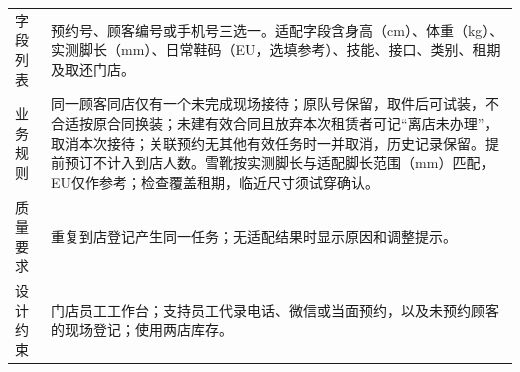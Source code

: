 \documentclass[11pt,a4paper]{article}
\newcommand{\bottomrule}{\hline}
\begin{document}
{\begin{longtable}{L{2.2cm}L{13.1cm}}
字段列表 & 预约号、顾客编号或手机号三选一。适配字段含身高（cm）、体重（kg）、实测脚长（mm）、日常鞋码（EU，选填参考）、技能、接口、类别、租期及取还门店。\\
业务规则 & 同一顾客同店仅有一个未完成现场接待；原队号保留，取件后可试装，不合适按原合同换装；未建有效合同且放弃本次租赁者可记“离店未办理”，取消本次接待；关联预约无其他有效任务时一并取消，历史记录保留。提前预订不计入到店人数。雪靴按实测脚长与适配脚长范围（mm）匹配，EU仅作参考；检查覆盖租期，临近尺寸须试穿确认。\\
质量要求 & 重复到店登记产生同一任务；无适配结果时显示原因和调整提示。\\
设计约束 & 门店员工工作台；支持员工代录电话、微信或当面预约，以及未预约顾客的现场登记；使用两店库存。\\
\bottomrule
\end{longtable}}

\clearpage
\end{document}
